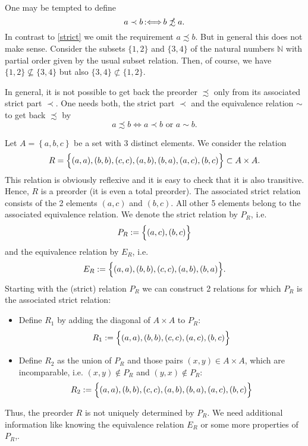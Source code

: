 ﻿\documentclass[a4paper,11pt,twoside,final]{article}
\newcommand{\nprecsim}{\mathrel{\ooalign{$\precsim$\cr
  \hidewidth\raise.225ex\hbox{$\slash\mkern2mu$}\cr}}\xspace}
\newcommand{\defby}{\mbox{\ensuremath{\,:\Longleftrightarrow\,}}\xspace}
\numberwithin{equation}{subsection}
\begin{document}
\begin{rem}\label{complement}
One may be tempted to define
\begin{equation*}
a \prec b\defby b \nprecsim a.
\end{equation*}
In contrast to \ref{strict} we omit the requirement $a\precsim b$. But in general this does not make sense. Consider the subsets $\{1,2\}$ and $\{3,4\}$ of the natural numbers $\mathbb{N}$ with partial order given by the usual subset relation. Then, of course, we have $\{1,2\}\nsubseteq \{3,4\}$ but also $\{3,4\}\nsubset\{1,2\}$.
\end{rem}

In general, it is not possible to get back the preorder $\precsim$ only from its associated strict part $\prec$. One needs both, the strict part $\prec$ and the equivalence relation $\sim$ to get back $\precsim$ by
\begin{equation*}
a \precsim b \Longleftrightarrow a \prec b \text{ or } a \sim b.
\end{equation*}

\begin{exam}\label{reconstruct}
Let $A=\left\{a,b,c\right\}$ be a set with 3 distinct elements. We consider the relation
\begin{equation*}
R=\Bigl\{(a,a),(b,b),(c,c),(a,b),(b,a),(a,c),(b,c)\Bigr\}\subset A\times A.
\end{equation*}
This relation is obviously reflexive and it is easy to check that it is also transitive. Hence, $R$ is a preorder (it is even a total preorder). The associated strict relation consists of the 2 elements $(a,c)$ and $(b,c)$. All other 5 elements belong to the associated equivalence relation. We denote the strict relation by $P_R$, i.e.
\begin{equation*}
P_R:=\Bigl\{(a,c),(b,c)\Bigr\}
\end{equation*}
and the equivalence relation by $E_R$, i.e.
\begin{equation*}
E_R:=\Bigl\{(a,a),(b,b),(c,c),(a,b),(b,a)\Bigr\}.
\end{equation*}
Starting with the (strict) relation $P_R$ we can construct 2 relations for which $P_R$ is the associated strict relation:
\begin{itemize}
\item Define $R_1$ by adding the diagonal of $A\times A$ to $P_R$:
\begin{equation*}
R_1:=\Bigl\{(a,a),(b,b),(c,c),(a,c),(b,c)\Bigr\}
\end{equation*}
\item Define $R_2$ as the union of $P_R$ and those pairs $(x,y)\in A\times A$, which are incomparable, i.e. $(x,y)\notin P_R$ and $(y,x)\notin P_R$:
\begin{equation*}
R_2:=\Bigl\{(a,a),(b,b),(c,c),(a,b),(b,a),(a,c),(b,c)\Bigr\}
\end{equation*}
\end{itemize}
Thus, the preorder $R$ is not uniquely determined by $P_R$. We need additional information like knowing the equivalence relation $E_R$ or some more properties of $P_R$,.
\end{exam}
\end{document}
